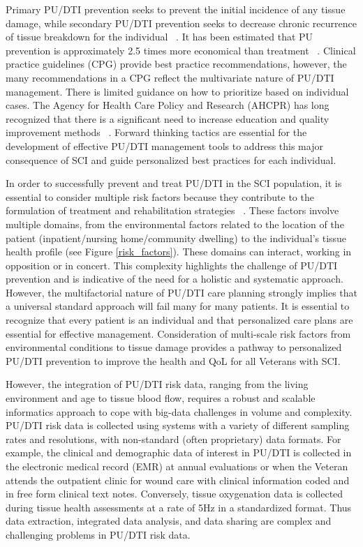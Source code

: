 \documentclass{amia}
\begin{document}
Primary PU/DTI prevention seeks to prevent the initial incidence of any tissue damage, while secondary PU/DTI prevention seeks to decrease chronic recurrence of tissue breakdown for the individual ~\cite{ref7}. It has been estimated that PU prevention is approximately 2.5 times more economical than treatment ~\cite{ref8}. Clinical practice guidelines (CPG) provide best practice recommendations, however, the many recommendations in a CPG reflect the multivariate nature of PU/DTI management. There is limited guidance on how to prioritize based on individual cases. The Agency for Health Care Policy and Research (AHCPR) has long recognized that there is a significant need to increase education and quality improvement methods ~\cite{ref9}. Forward thinking tactics are essential for the development of effective PU/DTI management tools to address this major consequence of SCI and guide personalized best practices for each individual.

In order to successfully prevent and treat PU/DTI in the SCI population, it is essential to consider multiple risk factors because they contribute to the formulation of treatment and rehabilitation strategies ~\cite{ref10}. These factors involve multiple domains, from the environmental factors related to the location of the patient (inpatient/nursing home/community dwelling) to the individual’s tissue health profile (see Figure \ref{risk_factors}). These domains can interact, working in opposition or in concert. This complexity highlights the challenge of PU/DTI prevention and is indicative of the need for a holistic and systematic approach. However, the multifactorial nature of PU/DTI care planning strongly implies that a universal standard approach will fail many for many patients. It is essential to recognize that every patient is an individual and that personalized care plans are essential for effective management. Consideration of multi-scale risk factors from environmental conditions to tissue damage provides a pathway to personalized PU/DTI prevention to improve the health and QoL for all Veterans with SCI.

However, the integration of PU/DTI risk data, ranging from the living environment and age to tissue blood flow, requires a robust and scalable informatics approach to cope with big-data challenges in volume and complexity. PU/DTI risk data is collected using systems with a variety of different sampling rates and resolutions, with non-standard (often proprietary) data formats. For example, the clinical and demographic data of interest in PU/DTI is collected in the electronic medical record (EMR) at annual evaluations or when the Veteran attends the outpatient clinic for wound care with clinical information coded and in free form clinical text notes. Conversely, tissue oxygenation data is collected during tissue health assessments at a rate of 5Hz in a standardized format. Thus data extraction, integrated data analysis, and data sharing are complex and challenging problems in PU/DTI risk data.
\end{document}
